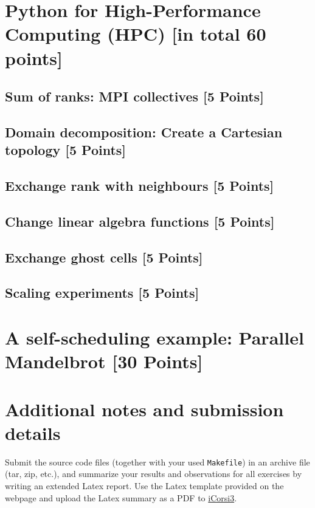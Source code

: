 \documentclass[unicode,11pt,a4paper,oneside,numbers=endperiod,openany]{scrartcl}
\begin{document}
\section{Python for High-Performance Computing (HPC) [in total 60 points]}

\subsection{Sum of ranks: MPI collectives [5 Points]}

\subsection{Domain decomposition: Create a Cartesian topology [5 Points]}

\subsection{Exchange rank with neighbours [5 Points]}

\subsection{Change linear algebra functions [5 Points]}

\subsection{Exchange ghost cells [5 Points]}

\subsection{Scaling experiments [5 Points]}

\section{A self-scheduling example: Parallel Mandelbrot [30 Points]}

\section*{Additional notes and submission details}
Submit the source code files (together with your used \texttt{Makefile}) in
an archive file (tar, zip, etc.), and summarize your results and
observations for all exercises by writing an extended Latex report.
Use the Latex template provided on the webpage and upload the Latex summary
as a PDF to \href{https://www.icorsi.ch/course/view.php?id=10049}{iCorsi3}.
\end{document}
